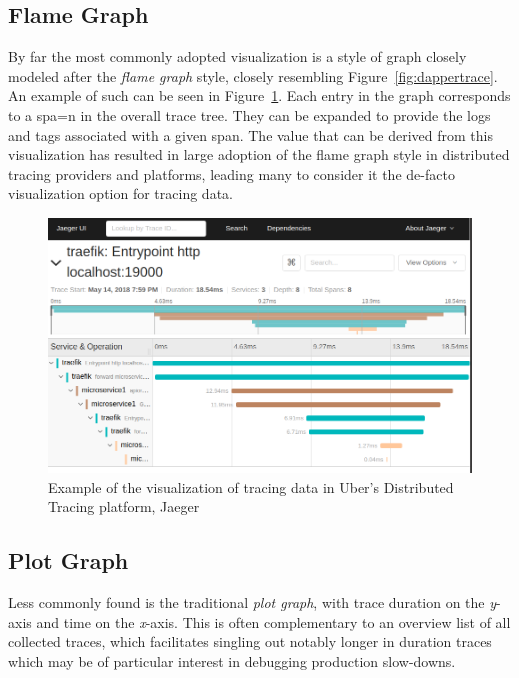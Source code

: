 \documentclass[pdftex,titlepage]{article}
\begin{document}
        \subsection{Flame Graph}
        By far the most commonly adopted visualization 
        is a style of graph closely modeled after the \textit{flame graph} style, closely resembling Figure~\ref{fig:dappertrace}. An example 
        of such can be seen in Figure~\ref{fig:jaeger}. Each entry in the graph corresponds to a spa=n in the overall trace tree. They can be
        expanded to provide the logs and tags associated with a given span. The value that can be derived from this visualization has resulted
        in large adoption of the flame graph style in distributed tracing providers and platforms, leading many to consider it the de-facto 
        visualization option for tracing data.

        \medskip

        \begin{figure}[htb!]
            \centering
            \includegraphics[scale=0.35]{jaeger}
            \caption{Example of the visualization of tracing data in Uber's Distributed Tracing platform, Jaeger}
            \label{fig:jaeger}
        \end{figure}

        \subsection{Plot Graph}
        Less commonly found is the traditional \textit{plot graph}, with trace duration on the \textit{y}-axis
        and time on the \textit{x}-axis. This is often complementary to an overview list of all collected traces, which
        facilitates singling out notably longer in duration traces which may be of particular interest in debugging production
        slow-downs. 
\end{document}
